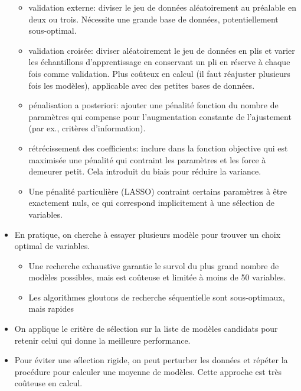 \documentclass[
  11pt,
  letterpaper,
]{scrbook}
\providecommand{\tightlist}{%
  \setlength{\itemsep}{0pt}\setlength{\parskip}{0pt}}\usepackage{longtable,booktabs,array}
\theoremstyle{definition}
\theoremstyle{remark}
\begin{document}
\begin{tcolorbox}
\begin{itemize}
  \begin{itemize}
  \tightlist
  \item
    validation externe: diviser le jeu de données aléatoirement au
    préalable en deux ou trois. Nécessite une grande base de données,
    potentiellement sous-optimal.
  \item
    validation croisée: diviser aléatoirement le jeu de données en plis
    et varier les échantillons d'apprentissage en conservant un pli en
    réserve à chaque fois comme validation. Plus coûteux en calcul (il
    faut réajuster plusieurs fois les modèles), applicable avec des
    petites bases de données.
  \item
    pénalisation a posteriori: ajouter une pénalité fonction du nombre
    de paramètres qui compense pour l'augmentation constante de
    l'ajustement (par ex., critères d'information).
  \item
    rétrécissement des coefficients: inclure dans la fonction objective
    qui est maximisée une pénalité qui contraint les paramètres et les
    force à demeurer petit. Cela introduit du biais pour réduire la
    variance.
  \item
    Une pénalité particulière (LASSO) contraint certains paramètres à
    être exactement nuls, ce qui correspond implicitement à une
    sélection de variables.
  \end{itemize}
\item
  En pratique, on cherche à essayer plusieurs modèle pour trouver un
  choix optimal de variables.

  \begin{itemize}
  \tightlist
  \item
    Une recherche exhaustive garantie le survol du plus grand nombre de
    modèles possibles, mais est coûteuse et limitée à moins de 50
    variables.
  \item
    Les algorithmes gloutons de recherche séquentielle sont
    sous-optimaux, mais rapides
  \end{itemize}
\item
  On applique le critère de sélection sur la liste de modèles candidats
  pour retenir celui qui donne la meilleure performance.
\item
  Pour éviter une sélection rigide, on peut perturber les données et
  répéter la procédure pour calculer une moyenne de modèles. Cette
  approche est très coûteuse en calcul.
\end{itemize}

\end{tcolorbox}
\end{document}

